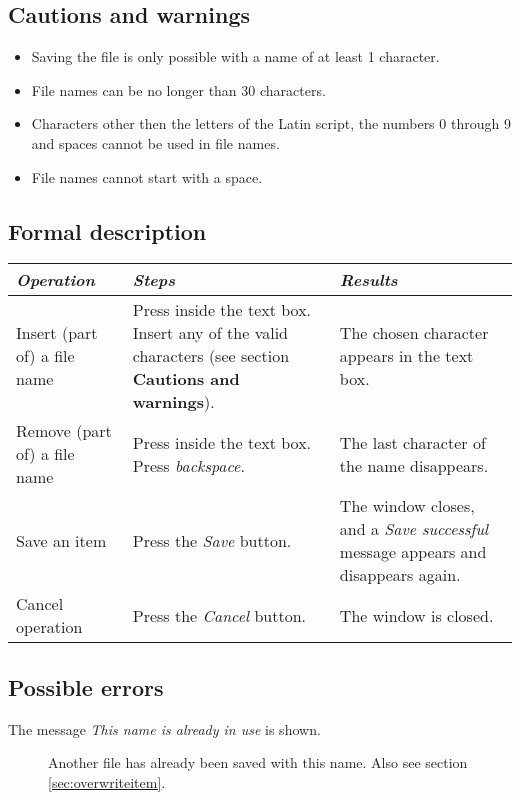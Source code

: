   \subsection*{Cautions and warnings}
  \begin{itemize}
  \item Saving the file is only possible with a name of at least 1 character.
  \item File names can be no longer than 30 characters.
  \item Characters other then the letters of the Latin script, the numbers 0 through 9 and spaces cannot be used in file names.
  \item File names cannot start with a space.
  \end{itemize}

  \subsection*{Formal description}
    \begin{tabularx}{\textwidth}{XXX}
    \toprule
    \emph{Operation} & \emph{Steps} & \emph{Results} \\
    \midrule
    Insert (part of) a file name & Press inside the text box. Insert any of the valid characters (see section \textbf{Cautions and warnings}). & The chosen character appears in the text box. \\
    \midrule
    Remove (part of) a file name & Press inside the text box. Press \emph{backspace}. & The last character of the name disappears. \\
    \midrule
    Save an item & Press the \emph{Save} button. & The window closes, and a \emph{Save successful} message appears and disappears again. \\
    \midrule
    Cancel operation & Press the \emph{Cancel} button. & The window is closed. \\
    \bottomrule
\end{tabularx}

  \subsection*{Possible errors}
  \begin{description}
  \item[The message \emph{This name is already in use} is shown.] Another file has already been saved with this name. Also see section \ref{sec:overwriteitem}.
  \end{description}

